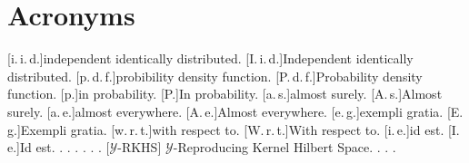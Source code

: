 %




\chapter*{Acronyms}

\begin{acronym}[vv-RKHS]
	[i.\,i.\,d.]{in\-de\-pen\-dent iden\-ti\-cal\-ly
	dis\-tri\-bu\-ted}.
	[I.\,i.\,d.]{In\-de\-pen\-dent iden\-ti\-cal\-ly
	dis\-tri\-bu\-ted}.
	[p.\,d.\,f.]{pro\-bi\-bi\-li\-ty den\-si\-ty func\-tion}.
	[P.\,d.\,f.]{Pro\-ba\-bi\-li\-ty den\-si\-ty func\-tion}.
	[p.]{in pro\-ba\-bi\-li\-ty}.
	[P.]{In pro\-ba\-bi\-li\-ty}.
	[a.\,s.]{al\-most su\-re\-ly}.
	[A.\,s.]{Al\-most su\-re\-ly}.
	[a.\,e.]{al\-most eve\-ry\-where}.
	[A.\,e.]{Al\-most eve\-ry\-where}.
	[e.\,g.]{ex\-em\-pli gra\-tia}.
	[E.\,g.]{Ex\-em\-pli gra\-tia}.
	[w.\,r.\,t.]{with res\-pect to}.
	[W.\,r.\,t.]{With res\-pect to}.
	[i.\,e.]{id est}.
	[I.\,e.]{Id est}.
	.
	.
	.
	.
	.
	.
	[\texorpdfstring{$\mathcal{Y}$}--RKHS]{%
	\texorpdfstring{$\mathcal{Y}$}--Re\-pro\-du\-cing Ker\-nel Hil\-bert
	Spa\-ce}.
	.
	.
	.
\end{acronym}

\endgroup
